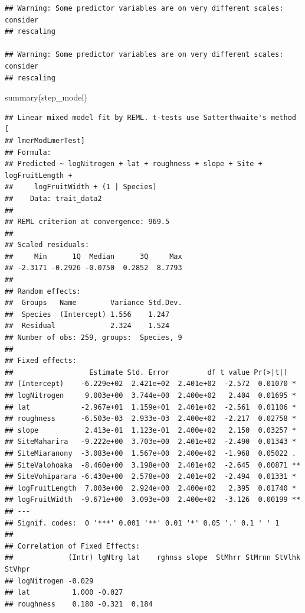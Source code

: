 \documentclass[
  12pt,
]{article}
\newenvironment{Shaded}{\begin{snugshade}}{\end{snugshade}}
\newcommand{\FunctionTok}[1]{\textcolor[rgb]{0.00,0.00,0.00}{#1}}
\newcommand{\NormalTok}[1]{#1}
\begin{document}
\begin{verbatim}
## Warning: Some predictor variables are on very different scales: consider
## rescaling

## Warning: Some predictor variables are on very different scales: consider
## rescaling
\end{verbatim}

\begin{Shaded}
\begin{Highlighting}[]
\FunctionTok{summary}\NormalTok{(step\_model)}
\end{Highlighting}
\end{Shaded}

\begin{verbatim}
## Linear mixed model fit by REML. t-tests use Satterthwaite's method [
## lmerModLmerTest]
## Formula: 
## Predicted ~ logNitrogen + lat + roughness + slope + Site + logFruitLength +  
##     logFruitWidth + (1 | Species)
##    Data: trait_data2
## 
## REML criterion at convergence: 969.5
## 
## Scaled residuals: 
##     Min      1Q  Median      3Q     Max 
## -2.3171 -0.2926 -0.0750  0.2852  8.7793 
## 
## Random effects:
##  Groups   Name        Variance Std.Dev.
##  Species  (Intercept) 1.556    1.247   
##  Residual             2.324    1.524   
## Number of obs: 259, groups:  Species, 9
## 
## Fixed effects:
##                  Estimate Std. Error         df t value Pr(>|t|)   
## (Intercept)    -6.229e+02  2.421e+02  2.401e+02  -2.572  0.01070 * 
## logNitrogen     9.003e+00  3.744e+00  2.400e+02   2.404  0.01695 * 
## lat            -2.967e+01  1.159e+01  2.401e+02  -2.561  0.01106 * 
## roughness      -6.503e-03  2.933e-03  2.400e+02  -2.217  0.02758 * 
## slope           2.413e-01  1.123e-01  2.400e+02   2.150  0.03257 * 
## SiteMaharira   -9.222e+00  3.703e+00  2.401e+02  -2.490  0.01343 * 
## SiteMiaranony  -3.083e+00  1.567e+00  2.400e+02  -1.968  0.05022 . 
## SiteValohoaka  -8.460e+00  3.198e+00  2.401e+02  -2.645  0.00871 **
## SiteVohiparara -6.430e+00  2.578e+00  2.401e+02  -2.494  0.01331 * 
## logFruitLength  7.003e+00  2.924e+00  2.400e+02   2.395  0.01740 * 
## logFruitWidth  -9.671e+00  3.093e+00  2.400e+02  -3.126  0.00199 **
## ---
## Signif. codes:  0 '***' 0.001 '**' 0.01 '*' 0.05 '.' 0.1 ' ' 1
## 
## Correlation of Fixed Effects:
##             (Intr) lgNtrg lat    rghnss slope  StMhrr StMrnn StVlhk StVhpr
## logNitrogen -0.029                                                        
## lat          1.000 -0.027                                                 
## roughness    0.180 -0.321  0.184                                          

\end{verbatim}
\end{document}
